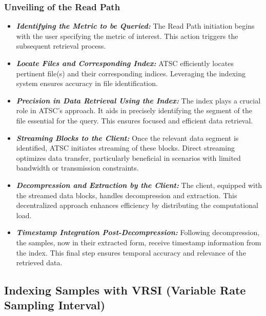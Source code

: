 \documentclass[conference]{IEEEtran}
\begin{document}
\vspace{10pt}
\subsubsection{Unveiling of the Read Path}\label{SCM}
\begin{itemize}

\item{\textbf{\textit{Identifying the Metric to be Queried:}}} The Read Path initiation begins with the user specifying the metric of interest. This action triggers the subsequent retrieval process.
\vspace{5pt}

\item{\textbf{\textit{Locate Files and Corresponding Index:}}} ATSC efficiently locates pertinent file(s) and their corresponding indices. Leveraging the indexing system ensures accuracy in file identification.
\vspace{5pt}
\item{\textbf{\textit{Precision in Data Retrieval Using the Index:}}} The index plays a crucial role in ATSC's approach. It aids in precisely identifying the segment of the file essential for the query. This ensures focused and efficient data retrieval.
\vspace{5pt}
\item{\textbf{\textit{Streaming Blocks to the Client:}}} Once the relevant data segment is identified, ATSC initiates streaming of these blocks. Direct streaming optimizes data transfer, particularly beneficial in scenarios with limited bandwidth or transmission constraints.
\vspace{5pt}
\item{\textbf{\textit{Decompression and Extraction by the Client:}}} The client, equipped with the streamed data blocks, handles decompression and extraction. This decentralized approach enhances efficiency by distributing the computational load.
\vspace{5pt}
\item{\textbf{\textit{Timestamp Integration Post-Decompression:}}} Following decompression, the samples, now in their extracted form, receive timestamp information from the index. This final step ensures temporal accuracy and relevance of the retrieved data.
\end{itemize}

\subsection{Indexing Samples with VRSI (Variable Rate Sampling Interval)}
\end{document}
